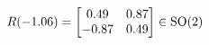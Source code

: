 \documentclass[preview]{standalone}
\begin{document}
\begin{align*}
\special{dvisvgm:raw <g id='unique000'>}R(-1.06) = \begin{bmatrix} 0.49 & 0.87 \\ -0.87 & 0.49 \end{bmatrix} \in \text{SO}(2)\special{dvisvgm:raw </g>}
\end{align*}
\end{document}
